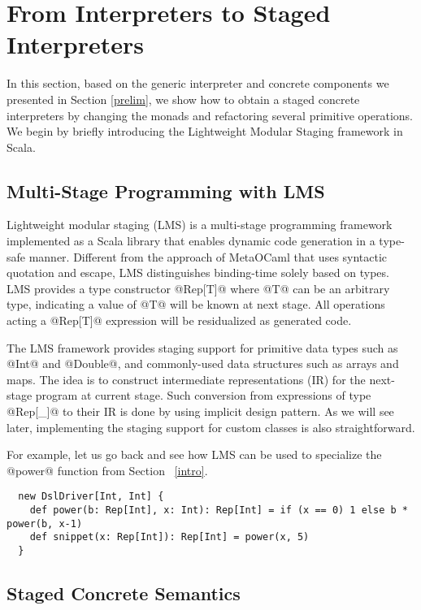 \section{From Interpreters to Staged Interpreters} \label{stagedinterp}

In this section, based on the generic interpreter and concrete components we
presented in Section \ref{prelim}, we show how to obtain a staged concrete
interpreters by changing the monads and refactoring several primitive
operations. We begin by briefly introducing the Lightweight Modular Staging
framework in Scala.

\subsection{Multi-Stage Programming with LMS}

Lightweight modular staging (LMS) \cite{DBLP:conf/gpce/RompfO10} is a
multi-stage programming framework implemented as a Scala library that enables
dynamic code generation in a type-safe manner. Different from the approach of
MetaOCaml \cite{DBLP:conf/flops/Kiselyov14, DBLP:conf/gpce/CalcagnoTHL03} that
uses syntactic quotation and escape, LMS distinguishes binding-time solely based
on types. LMS provides a type constructor @Rep[T]@ where @T@ can be an arbitrary
type, indicating a value of @T@ will be known at next stage. All operations
acting a @Rep[T]@ expression will be residualized as generated code.

The LMS framework provides staging support for primitive data types such as
@Int@ and @Double@, and commonly-used data structures such as arrays and maps.
The idea is to construct intermediate representations (IR) for the next-stage
program at current stage. Such conversion from expressions of type @Rep[_]@ to
their IR is done by using implicit design pattern. As we will see later,
implementing the staging support for custom classes is also straightforward.

For example, let us go back and see how LMS can be used to specialize the
@power@ function from Section ~\ref{intro}.

\begin{lstlisting}
  new DslDriver[Int, Int] {
    def power(b: Rep[Int], x: Int): Rep[Int] = if (x == 0) 1 else b * power(b, x-1)
    def snippet(x: Rep[Int]): Rep[Int] = power(x, 5)
  }
\end{lstlisting}


\subsection{Staged Concrete Semantics}

